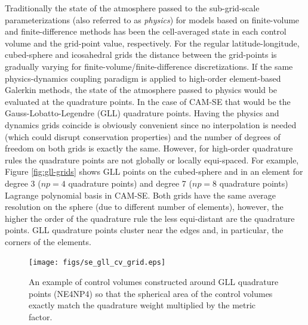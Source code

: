 \documentclass[twocol]{ametsoc}
\begin{document}
Traditionally the state of the atmosphere passed to the sub-grid-scale parameterizations (also referred to as {\em{physics}}) for models based on finite-volume and finite-difference methods has been the cell-averaged state in each control volume and the grid-point value, respectively. For the regular latitude-longitude, cubed-sphere and icosahedral grids the distance between the grid-points is gradually varying for finite-volume/finite-difference discretizations. If the same physics-dynamics coupling paradigm is applied to high-order element-based Galerkin methods, the state of the atmosphere passed to physics would be evaluated at the quadrature points. In the case of CAM-SE that would be the Gauss-Lobatto-Legendre (GLL) quadrature points. Having the physics and dynamics grids coincide is obviously convenient since no interpolation is needed (which could disrupt conservation properties) and the number of degrees of freedom on both grids is exactly the same. However, for high-order quadrature rules the quadrature points are not globally or locally equi-spaced. For example, Figure \ref{fig:gll-grids} shows GLL points on the cubed-sphere and in an element for degree 3 ($np=4$ quadrature points) and degree 7 ($np=8$ quadrature points) Lagrange polynomial basis in CAM-SE. Both grids have the same average resolution on the sphere (due to different number of elements), however, the higher the order of the quadrature rule the less equi-distant are the quadrature points. GLL quadrature points cluster near the edges and, in particular, the corners of the elements.

\begin{figure}[t]
\noindent\texttt{[image: figs/se\_gll\_cv\_grid.eps]}\\
\caption{An example of control volumes constructed around GLL quadrature points (NE4NP4) so that the spherical area of the control volumes exactly match the quadrature weight multiplied by the metric factor.}
\label{fig:cv-grids}
\end{figure}
\end{document}
